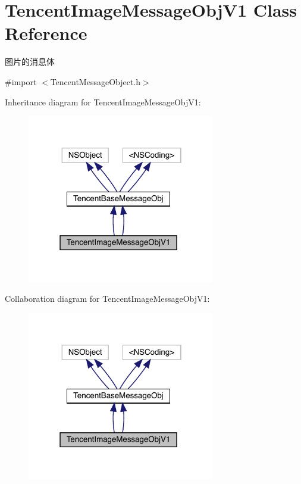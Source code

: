 \hypertarget{interface_tencent_image_message_obj_v1}{}\section{Tencent\+Image\+Message\+Obj\+V1 Class Reference}
\label{interface_tencent_image_message_obj_v1}


图片的消息体  




{\ttfamily \#import $<$Tencent\+Message\+Object.\+h$>$}



Inheritance diagram for Tencent\+Image\+Message\+Obj\+V1\+:\nopagebreak
\begin{figure}[H]
\begin{center}
\leavevmode
\includegraphics[width=232pt]{interface_tencent_image_message_obj_v1__inherit__graph}
\end{center}
\end{figure}


Collaboration diagram for Tencent\+Image\+Message\+Obj\+V1\+:\nopagebreak
\begin{figure}[H]
\begin{center}
\leavevmode
\includegraphics[width=232pt]{interface_tencent_image_message_obj_v1__coll__graph}
\end{center}
\end{figure}

